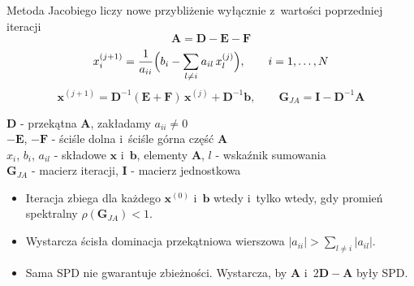 \begin{frame}{Metoda Jacobiego liczy nowe przybliżenie wyłącznie z~wartości poprzedniej iteracji}
  \tightdisplays\eqtop
  \[ \mathbf{A} = \mathbf{D} - \mathbf{E} - \mathbf{F} \]
  \[ x_i^{(j+1)} = \frac{1}{a_{ii}} \Bigl( b_i - \sum_{l \ne i} a_{il} \, x_l^{(j)} \Bigr), \qquad i = 1, \dots, N \]
  \[ \mathbf{x}^{(j+1)} = \mathbf{D}^{-1} (\mathbf{E} + \mathbf{F}) \, \mathbf{x}^{(j)} + \mathbf{D}^{-1} \mathbf{b}, \qquad \mathbf{G}_{JA} = \mathbf{I} - \mathbf{D}^{-1} \mathbf{A} \]
  \par\vspace{1mm}
  {\footnotesize
  $\mathbf{D}$ - przekątna $\mathbf{A}$, zakładamy $a_{ii} \ne 0$\\
  $-\mathbf{E}$, $-\mathbf{F}$ - ściśle dolna i~ściśle górna część $\mathbf{A}$\\
  $x_i$, $b_i$, $a_{il}$ - składowe $\mathbf{x}$ i~$\mathbf{b}$, elementy $\mathbf{A}$, $l$ - wskaźnik sumowania\\
  $\mathbf{G}_{JA}$ - macierz iteracji, $\mathbf{I}$ - macierz jednostkowa\par}
  \begin{itemize}
    \item Iteracja zbiega dla każdego $\mathbf{x}^{(0)}$ i~$\mathbf{b}$ wtedy i~tylko wtedy, gdy promień spektralny $\rho(\mathbf{G}_{JA}) < 1$.
    \item Wystarcza ścisła dominacja przekątniowa wierszowa $|a_{ii}| > \sum_{l \ne i} |a_{il}|$.
    \item Sama SPD nie gwarantuje zbieżności. Wystarcza, by $\mathbf{A}$ i~$2\mathbf{D} - \mathbf{A}$ były SPD.
  \end{itemize}
\end{frame}

